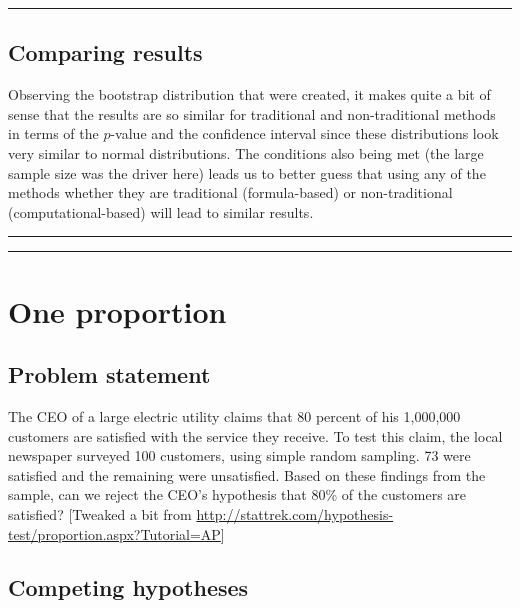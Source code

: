 \documentclass[12pt, krantz2,]{krantz}
\begin{document}
\begin{center}\rule{0.5\linewidth}{\linethickness}\end{center}

\hypertarget{comparing-results}{%
\subsection{Comparing results}\label{comparing-results}}

Observing the bootstrap distribution that were created, it makes quite a bit of sense that the results are so similar for traditional and non-traditional methods in terms of the \(p\)-value and the confidence interval since these distributions look very similar to normal distributions. The conditions also being met (the large sample size was the driver here) leads us to better guess that using any of the methods whether they are traditional (formula-based) or non-traditional (computational-based) will lead to similar results.

\begin{center}\rule{0.5\linewidth}{\linethickness}\end{center}

\begin{center}\rule{0.5\linewidth}{\linethickness}\end{center}

\hypertarget{one-proportion}{%
\section{One proportion}\label{one-proportion}}

\hypertarget{problem-statement-1}{%
\subsection{Problem statement}\label{problem-statement-1}}

The CEO of a large electric utility claims that 80 percent of his 1,000,000 customers are satisfied with the service they receive. To test this claim, the local newspaper surveyed 100 customers, using simple random sampling. 73 were satisfied and the remaining were unsatisfied. Based on these findings from the sample, can we reject the CEO's hypothesis that 80\% of the customers are satisfied? {[}Tweaked a bit from \url{http://stattrek.com/hypothesis-test/proportion.aspx?Tutorial=AP}{]}

\hypertarget{competing-hypotheses-1}{%
\subsection{Competing hypotheses}\label{competing-hypotheses-1}}
\end{document}
